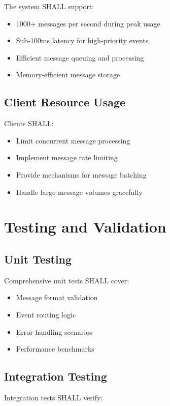 \documentclass[12pt,a4paper]{article}
\begin{document}
The system SHALL support:

\begin{itemize}
\item 1000+ messages per second during peak usage
\item Sub-100ms latency for high-priority events
\item Efficient message queuing and processing
\item Memory-efficient message storage
\end{itemize}

\subsection{Client Resource Usage}

Clients SHALL:

\begin{itemize}
\item Limit concurrent message processing
\item Implement message rate limiting
\item Provide mechanisms for message batching
\item Handle large message volumes gracefully
\end{itemize}

\section{Testing and Validation}

\subsection{Unit Testing}

Comprehensive unit tests SHALL cover:

\begin{itemize}
\item Message format validation
\item Event routing logic
\item Error handling scenarios
\item Performance benchmarks
\end{itemize}

\subsection{Integration Testing}

Integration tests SHALL verify:
\end{document}
